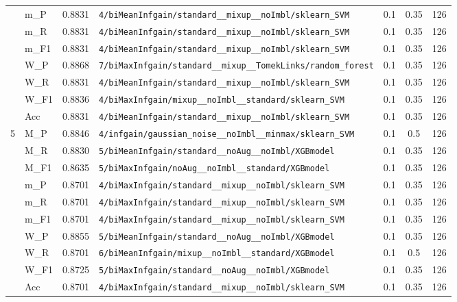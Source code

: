 \begin{table}[htbp]
\begin{tabular}{|c|l|c|>{\ttfamily\footnotesize}p{7.2cm}|c|c|c|}
 & m\_P & 0.8831 & \texttt{4/biMeanInfgain/standard\_\_mixup\_\_noImbl/sklearn\_SVM} & 0.1 & 0.35  & 126 \\ 
 & m\_R & 0.8831 & \texttt{4/biMeanInfgain/standard\_\_mixup\_\_noImbl/sklearn\_SVM} & 0.1 & 0.35  & 126 \\ 
 & m\_F1 & 0.8831 & \texttt{4/biMeanInfgain/standard\_\_mixup\_\_noImbl/sklearn\_SVM} & 0.1 & 0.35  & 126 \\ 
 & W\_P & 0.8868 & \texttt{7/biMaxInfgain/standard\_\_mixup\_\_TomekLinks/random\_forest} & 0.1 & 0.35  & 126 \\ 
 & W\_R & 0.8831 & \texttt{4/biMeanInfgain/standard\_\_mixup\_\_noImbl/sklearn\_SVM} & 0.1 & 0.35  & 126 \\ 
 & W\_F1 & 0.8836 & \texttt{4/biMaxInfgain/mixup\_\_noImbl\_\_standard/sklearn\_SVM} & 0.1 & 0.35  & 126 \\ 
 & Acc & 0.8831 & \texttt{4/biMeanInfgain/standard\_\_mixup\_\_noImbl/sklearn\_SVM} & 0.1 & 0.35  & 126 \\ 
\hline
\multirow{10}{*}{5} & M\_P & 0.8846 & \texttt{4/infgain/gaussian\_noise\_\_noImbl\_\_minmax/sklearn\_SVM} & 0.1 & 0.5  & 126 \\ 
 & M\_R & 0.8830 & \texttt{5/biMeanInfgain/standard\_\_noAug\_\_noImbl/XGBmodel} & 0.1 & 0.35  & 126 \\ 
 & M\_F1 & 0.8635 & \texttt{5/biMaxInfgain/noAug\_\_noImbl\_\_standard/XGBmodel} & 0.1 & 0.35  & 126 \\ 
 & m\_P & 0.8701 & \texttt{4/biMaxInfgain/standard\_\_mixup\_\_noImbl/sklearn\_SVM} & 0.1 & 0.35  & 126 \\ 
 & m\_R & 0.8701 & \texttt{4/biMaxInfgain/standard\_\_mixup\_\_noImbl/sklearn\_SVM} & 0.1 & 0.35  & 126 \\ 
 & m\_F1 & 0.8701 & \texttt{4/biMaxInfgain/standard\_\_mixup\_\_noImbl/sklearn\_SVM} & 0.1 & 0.35  & 126 \\ 
 & W\_P & 0.8855 & \texttt{5/biMeanInfgain/standard\_\_noAug\_\_noImbl/XGBmodel} & 0.1 & 0.35  & 126 \\ 
 & W\_R & 0.8701 & \texttt{6/biMeanInfgain/mixup\_\_noImbl\_\_standard/XGBmodel} & 0.1 & 0.5  & 126 \\ 
 & W\_F1 & 0.8725 & \texttt{5/biMaxInfgain/standard\_\_noAug\_\_noImbl/XGBmodel} & 0.1 & 0.35  & 126 \\ 
 & Acc & 0.8701 & \texttt{4/biMaxInfgain/standard\_\_mixup\_\_noImbl/sklearn\_SVM} & 0.1 & 0.35  & 126 \\ 
\hline
\end{tabular}
\end{table}